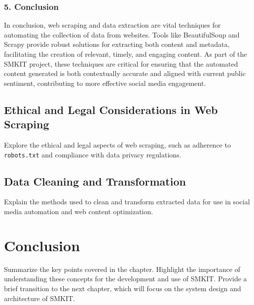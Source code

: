 \subsubsection{5. Conclusion}

In conclusion, web scraping and data extraction are vital techniques for automating the collection of data from websites. Tools like BeautifulSoup and Scrapy provide robust solutions for extracting both content and metadata, facilitating the creation of relevant, timely, and engaging content. As part of the SMKIT project, these techniques are critical for ensuring that the automated content generated is both contextually accurate and aligned with current public sentiment, contributing to more effective social media engagement.


\subsection{Ethical and Legal Considerations in Web Scraping}
\label{subsec:ethical_and_legal_considerations_in_web_scraping}
Explore the ethical and legal aspects of web scraping, such as adherence to \texttt{robots.txt} and compliance with data privacy regulations.

\subsection{Data Cleaning and Transformation}
\label{subsec:data_cleaning_and_transformation}
Explain the methods used to clean and transform extracted data for use in social media automation and web content optimization.

\section{Conclusion}
\label{sec:preliminaries_conclusion}
Summarize the key points covered in the chapter.
Highlight the importance of understanding these concepts for the development and use of SMKIT. Provide a brief transition to the next chapter, which will focus on the system design and architecture of SMKIT.
